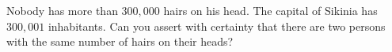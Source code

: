 Nobody has more than $300{,}000$ hairs on his head. The capital of Sikinia has $300{,}001$ inhabitants. Can you assert with certainty that there are two persons with the same number of hairs on their heads?
